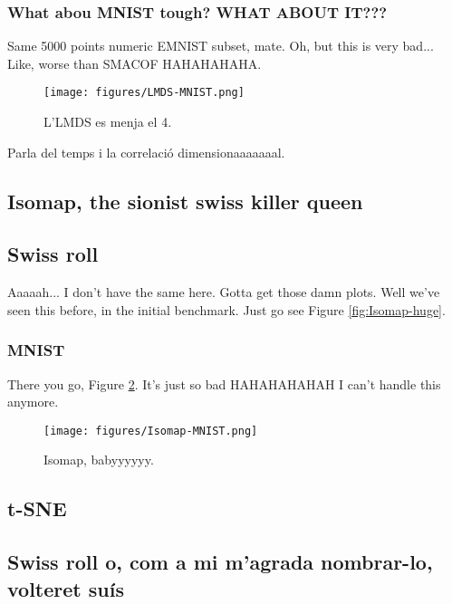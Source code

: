 \subsubsection{What abou MNIST tough? WHAT ABOUT IT???}

Same 5000 points numeric EMNIST subset, mate. Oh, but this is very bad... Like, worse than SMACOF HAHAHAHAHA.

\begin{figure}[ht]
    \centering
    \texttt{[image: figures/LMDS-MNIST.png]}
    \caption{L'LMDS es menja el 4.}
    \label{fig:LMDS-MNIST}
\end{figure}

Parla del temps i la correlació dimensionaaaaaaal.

\subsection{Isomap, the sionist swiss killer queen}

\subsection{Swiss roll}

Aaaaah... I don't have the same here. Gotta get those damn plots. Well we've seen this before, in the initial benchmark. Just go see Figure \ref{fig:Isomap-huge}.

\subsubsection{MNIST}

There you go, Figure \ref{fig:Isomap-MNIST}. It's just so bad HAHAHAHAHAH I can't handle this anymore.

\begin{figure}[ht]
    \centering
    \texttt{[image: figures/Isomap-MNIST.png]}
    \caption{Isomap, babyyyyyy.}
    \label{fig:Isomap-MNIST}
\end{figure}

\subsection{t-SNE}

\subsection{Swiss roll o, com a mi m'agrada nombrar-lo, volteret suís}

